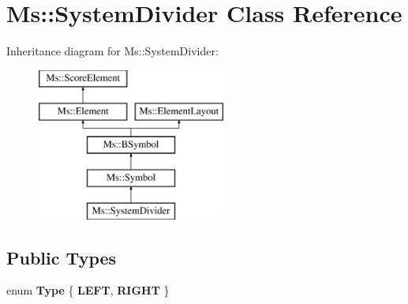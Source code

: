 \hypertarget{class_ms_1_1_system_divider}{}\section{Ms\+:\+:System\+Divider Class Reference}
\label{class_ms_1_1_system_divider}
Inheritance diagram for Ms\+:\+:System\+Divider\+:\begin{figure}[H]
\begin{center}
\leavevmode
\includegraphics[height=5.000000cm]{class_ms_1_1_system_divider}
\end{center}
\end{figure}
\subsection*{Public Types}
\begin{DoxyCompactItemize}
\item 
\mbox{\label{class_ms_1_1_system_divider_a61e3a3b0ba4a2ad92a587732b662d196}} 
enum {\bfseries Type} \{ {\bfseries L\+E\+FT}, 
{\bfseries R\+I\+G\+HT}
 \}
\end{DoxyCompactItemize}
